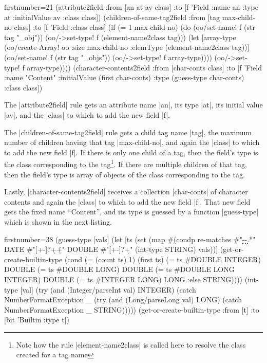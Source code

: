 \documentclass[a4paper]{article}
\newcommand{\code}{\clojureinline}
\begin{document}
\begin{clojurecode*}{firstnumber=21}
  (attribute2field
   :from [an at av class]
   :to   [f 'Field {:name an :type at :initialValue av :class class}])
  (children-of-same-tag2field
   :from [tag max-child-no class]
   :to   [f 'Field {:class class}]
   (if (= 1 max-child-no)
     (do (oo/set-name! f (str tag "_obj"))
         (oo/->set-type! f (element-name2class tag)))
     (let [array-type (oo/create-Array! oo :size max-child-no :elemType (element-name2class tag))]
       (oo/set-name! f (str tag "_objs"))
       (oo/->set-type! f array-type))))
       (oo/->set-type! f array-type))))
  (character-contents2field
   :from [char-conts class]
   :to   [f 'Field {:name "Content" :initialValue (first char-conts)
                    :type (guess-type char-conts) :class class}])
\end{clojurecode*}

The \code|attribute2field| rule gets an attribute name \code|an|, its type
\code|at|, its initial value \code|av|, and the \code|class| to which to add
the new field \code|f|.

The \code|children-of-same-tag2field| rule gets a child tag name \code|tag|,
the maximum number of children having that tag \code|max-child-no|, and again
the \code|class| to which to add the new field \code|f|.  If there is only one
child of a tag, then the field's type is the class corresponding to the
tag\footnote{Note how the rule \code|element-name2class| is called here to
  resolve the class created for a tag name}.  If there are multiple children of
that tag, then the field's type is array of objects of the class corresponding
to the tag.

Lastly, \code|character-contents2field| receives a collection \code|char-conts|
of character contents and again the \code|class| to which to add the new field
\code|f|.  That new field gets the fixed name ``Content'', and its type is
guessed by a function \code|guess-type| which is shown in the next listing.

\begin{clojurecode*}{firstnumber=38}
  (guess-type [vals]
   (let [ts (set (map #(condp re-matches %
                         #"\d\d\d\d-\d\d-\d\d.*" DATE
                         #"[+-]?\d+\.\d+"        DOUBLE
                         #"[+-]?\d+"             (int-type %
                         STRING) vals))]
     (get-or-create-builtin-type
      (cond
       (= (count ts) 1)              (first ts)
       (= ts #{DOUBLE INTEGER})      DOUBLE
       (= ts #{DOUBLE LONG})         DOUBLE
       (= ts #{DOUBLE LONG INTEGER}) DOUBLE
       (= ts #{INTEGER LONG})        LONG
       :else                         STRING))))
  (int-type [val]
   (try (and (Integer/parseInt val) INTEGER)
        (catch NumberFormatException _
          (try (and (Long/parseLong val) LONG)
               (catch NumberFormatException _
                 STRING)))))
  (get-or-create-builtin-type
   :from [t]
   :to   [bit 'Builtin {:type t}])
\end{clojurecode*}
\end{document}
